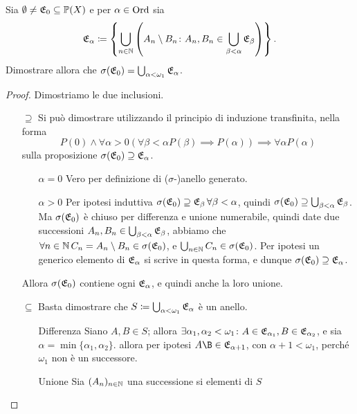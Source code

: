 \documentclass[../EserciziIstituzioniAnalisi.tex]{subfiles}
\begin{document}
\begin{exercise}  
  Sia $\emptyset \neq \mathfrak E_0 \subseteq \mathbb P(X)$ e per $\alpha \in \operatorname{Ord}$ sia 
\begin{equation}
  \mathfrak E_{\alpha}\coloneqq \left\{ \bigcup_{n\in \mathbb N} \left(A_n\setminus B_n \colon A_n,B_n \in \bigcup_{\beta<\alpha}\mathfrak E_{\beta}\right)\right\}.
\end{equation}
Dimostrare allora che $\sigma(\mathfrak E_0)=\bigcup_{\alpha<\omega_1}\mathfrak E_{\alpha}$.
\end{exercise}
\begin{proof}
  Dimostriamo le due inclusioni.
  \begin{itemize}
    \item[$\supseteq$] Si può dimostrare utilizzando il principio di induzione transfinita, nella forma
    $$P(0)\land \forall \alpha>0 \left(\forall \beta<\alpha P(\beta) \implies P(\alpha) \right) \implies \forall \alpha P(\alpha)$$
    sulla proposizione $\sigma(\mathfrak E_0)\supseteq\mathfrak E_{\alpha}$.
    \begin{itemize}
      \item[$\alpha=0$] Vero per definizione di ($\sigma$-)anello generato.
      \item[$\alpha>0$] Per ipotesi induttiva $\sigma(\mathfrak E_0)\supseteq\mathfrak E_{\beta}\, \forall \beta<\alpha$, quindi $\sigma(\mathfrak E_0)\supseteq\bigcup_{\beta<\alpha}\mathfrak E_{\beta}$. Ma $\sigma(\mathfrak E_0)$ è chiuso per differenza e unione numerabile, quindi date due successioni $A_n, B_n \in \bigcup_{\beta<\alpha}\mathfrak E_{\beta}$, abbiamo che $\forall n \in \mathbb N\, C_n=A_n\setminus B_n\in \sigma(\mathfrak E_0)$, e $\bigcup_{n\in \mathbb N}C_n \in \sigma(\mathfrak E_0)$. Per ipotesi un generico elemento di $\mathfrak E_{\alpha}$ si scrive in questa forma, e dunque $\sigma(\mathfrak E_0)\supseteq\mathfrak E_{\alpha}$.
    \end{itemize}
    Allora $\sigma(\mathfrak E_0)$ contiene ogni $\mathfrak E_{\alpha}$, e quindi anche la loro unione.
    \item[$\subseteq$] Basta dimostrare che $S\coloneqq\bigcup_{\alpha<\omega_1}\mathfrak E_{\alpha}$ è un anello.
    \begin{itemize}
      \item[Differenza] Siano $A,B\in S$; allora $\exists \alpha_1, \alpha_2<\omega_1 \colon A\in \mathfrak E_{\alpha_1}, B\in \mathfrak E_{\alpha_2}$, e sia $\alpha=\min\{\alpha_1, \alpha_2\}$. allora per ipotesi $A\B\in\E_{\alpha+1}$, con $\alpha+1<\omega_1$, perché $\omega_1$ non è un successore.      
      \item[Unione] Sia $(A_n)_{n\in\mathbb N}$ una successione si elementi di $S$ 
    \end{itemize}
  \end{itemize}
\end{proof}
\end{document}
